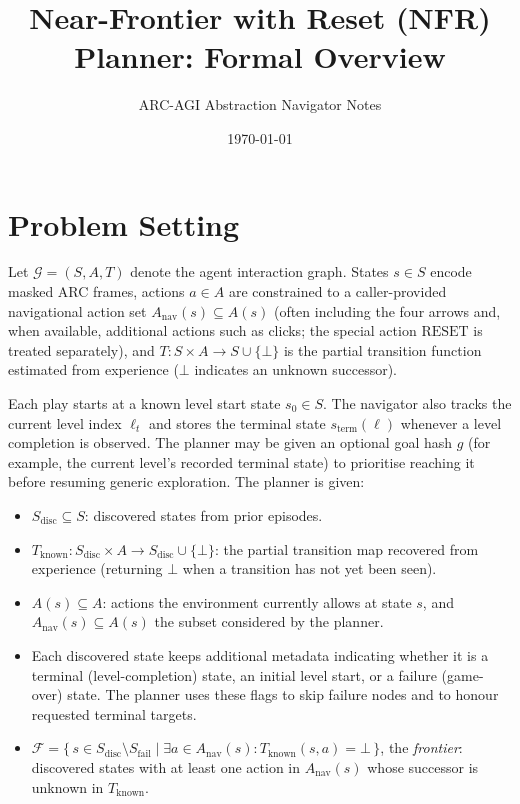 \documentclass[11pt]{article}
\title{Near-Frontier with Reset (NFR) Planner: Formal Overview}
\author{ARC-AGI Abstraction Navigator Notes}
\date{\today}
\begin{document}
\maketitle

\section{Problem Setting}

Let $\mathcal{G} = (S, A, T)$ denote the agent interaction graph. States $s \in S$ encode masked ARC frames, actions $a \in A$ are constrained to a caller-provided navigational action set $A_{\mathrm{nav}}(s) \subseteq A(s)$ (often including the four arrows and, when available, additional actions such as clicks; the special action $\mathrm{RESET}$ is treated separately), and $T : S \times A \to S \cup \{\bot\}$ is the partial transition function estimated from experience ($\bot$ indicates an unknown successor).

Each play starts at a known level start state $s_0 \in S$. The navigator also tracks the current level index $\ell_t$ and stores the terminal state $s_{\mathrm{term}}(\ell)$ whenever a level completion is observed. The planner may be given an optional goal hash $g$ (for example, the current level's recorded terminal state) to prioritise reaching it before resuming generic exploration. The planner is given:
\begin{itemize}
    \item $S_{\mathrm{disc}} \subseteq S$: discovered states from prior episodes.
    \item $T_{\mathrm{known}} : S_{\mathrm{disc}} \times A \to S_{\mathrm{disc}} \cup \{\bot\}$: the partial transition map recovered from experience (returning $\bot$ when a transition has not yet been seen).
    \item $A(s) \subseteq A$: actions the environment currently allows at state $s$, and $A_{\mathrm{nav}}(s) \subseteq A(s)$ the subset considered by the planner.
    \item Each discovered state keeps additional metadata indicating whether it is a terminal (level-completion) state, an initial level start, or a failure (game-over) state. The planner uses these flags to skip failure nodes and to honour requested terminal targets.
    \item $\mathcal{F} = \{\, s \in S_{\mathrm{disc}} \setminus S_{\mathrm{fail}} \mid \exists a \in A_{\mathrm{nav}}(s) : T_{\mathrm{known}}(s,a) = \bot \,\}$, the \emph{frontier}: discovered states with at least one action in $A_{\mathrm{nav}}(s)$ whose successor is unknown in $T_{\mathrm{known}}$.
\end{itemize}
\end{document}
